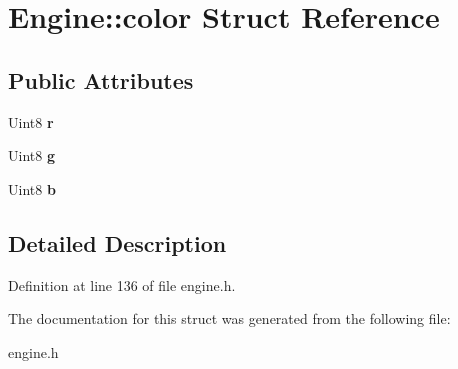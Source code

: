 \hypertarget{structEngine_1_1color}{}\section{Engine\+:\+:color Struct Reference}
\label{structEngine_1_1color}
\subsection*{Public Attributes}
\begin{DoxyCompactItemize}
\item 
\mbox{\label{structEngine_1_1color_ad2f4cb4cb1d9b251100bd1a4ebfa6b1e}} 
Uint8 {\bfseries r}
\item 
\mbox{\label{structEngine_1_1color_a3e4b52509fd71e8551d297cd87073af4}} 
Uint8 {\bfseries g}
\item 
\mbox{\label{structEngine_1_1color_a2c684bfdca0608a79500f714671b97e9}} 
Uint8 {\bfseries b}
\end{DoxyCompactItemize}


\subsection{Detailed Description}


Definition at line 136 of file engine.\+h.



The documentation for this struct was generated from the following file\+:\begin{DoxyCompactItemize}
\item 
engine.\+h\end{DoxyCompactItemize}
